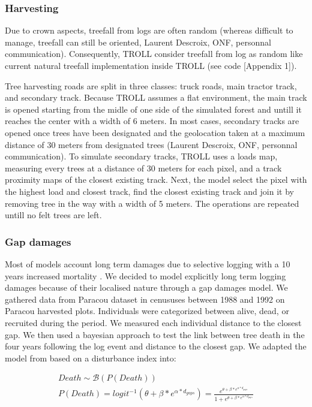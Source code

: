 \documentclass[12pt,]{article}
\theoremstyle{definition}
\theoremstyle{definition}
\theoremstyle{remark}
\begin{document}
\subsubsection{Harvesting}\label{harvesting}

Due to crown aspects, treefall from logs are often random (whereas
difficult to manage, treefall can still be oriented, Laurent Descroix,
ONF, personnal communication). Consequently, TROLL consider treefall
from log as random like current natural treefall implementation inside
TROLL (see code {[}Appendix 1{]}).

Tree harvesting roads are split in three classes: truck roads, main
tractor track, and secondary track. Because TROLL assumes a flat
environment, the main track is opened starting from the midle of one
side of the simulated forest and untill it reaches the center with a
width of 6 meters. In most cases, secondary tracks are opened once trees
have been designated and the geolocation taken at a maximum distance of
30 meters from designated trees (Laurent Descroix, ONF, personnal
communication). To simulate secondary tracks, TROLL uses a loads map,
measuring every trees at a distance of 30 meters for each pixel, and a
track proximity maps of the closest existing track. Next, the model
select the pixel with the highest load and closest track, find the
closest existing track and join it by removing tree in the way with a
width of 5 meters. The operations are repeated untill no felt trees are
left.

\subsubsection{Gap damages}\label{gap-damages}

Most of models account long term damages due to selective logging with a
10 years increased mortality \citep{Huth2004, Khler2004, Ruger2008}. We
decided to model explicitly long term logging damages because of their
localised nature through a gap damages model. We gathered data from
Paracou dataset \citep{Guehl2004} in cenususes between 1988 and 1992 on
Paracou harvested plots. Individuals were categorized between alive,
dead, or recruited during the period. We measured each individual
distance to the closest gap. We then used a bayesian approach to test
the link between tree death in the four years following the log event
and distance to the closest gap. We adapted the model from
\citet{Herault2010} based on a disturbance index into:

\begin{equation}
  \begin{array}{c} 
    Death \sim \mathcal{B}(P(Death)) \\
    P(Death) = logit^{-1}(\theta + \beta*e^{\alpha*d_{gaps}}) = \frac{e^{\theta + \beta*e^{\alpha*d_{gaps}}}}{1 + e^{\theta + \beta*e^{\alpha*d_{gaps}}}}
  \end{array}
  \label{eq:death}
\end{equation}
\end{document}
